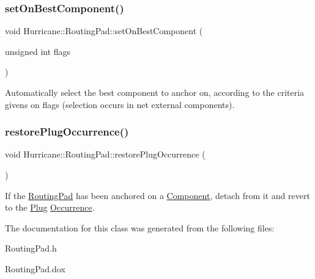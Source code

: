 \subsubsection{\texorpdfstring{set\+On\+Best\+Component()}{setOnBestComponent()}}
{\footnotesize\ttfamily void Hurricane\+::\+Routing\+Pad\+::set\+On\+Best\+Component (\begin{DoxyParamCaption}\item[{unsigned int}]{flags }\end{DoxyParamCaption})}

Automatically select the best component to anchor on, according to the criteria givens on {\ttfamily flags} (selection occurs in net external components). \mbox{\label{classHurricane_1_1RoutingPad_a1fcb0951f5f9505c6978bf498f78fce9}} 
\subsubsection{\texorpdfstring{restore\+Plug\+Occurrence()}{restorePlugOccurrence()}}
{\footnotesize\ttfamily void Hurricane\+::\+Routing\+Pad\+::restore\+Plug\+Occurrence (\begin{DoxyParamCaption}{ }\end{DoxyParamCaption})}

If the \mbox{\hyperlink{classHurricane_1_1RoutingPad}{Routing\+Pad}} has been anchored on a \mbox{\hyperlink{classHurricane_1_1Component}{Component}}, detach from it and revert to the \mbox{\hyperlink{classHurricane_1_1Plug}{Plug}} \mbox{\hyperlink{classHurricane_1_1Occurrence}{Occurrence}}. 

The documentation for this class was generated from the following files\+:\begin{DoxyCompactItemize}
\item 
Routing\+Pad.\+h\item 
Routing\+Pad.\+dox\end{DoxyCompactItemize}
